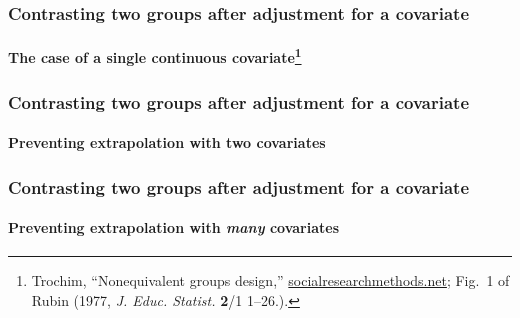 \begin{frame} \frametitle{Contrasting two groups after adjustment for a covariate}
\framesubtitle{The case of a single continuous
  covariate\footnote{Trochim, ``Nonequivalent groups design,''
    \url{socialresearchmethods.net}; Fig.~1 of Rubin (1977, \textit{J. Educ. Statist.} \textbf{2}/1 1--26.).}}

\begin{center}
{}
\end{center}

\end{frame}

\begin{frame}[label=contrast2grFr]
  \frametitle{Contrasting two groups after adjustment for a covariate}
\framesubtitle{Preventing extrapolation with two covariates}

\begin{center}
\end{center}

\end{frame}


\begin{frame}
  \frametitle{Contrasting two groups after adjustment for a covariate}
\framesubtitle{Preventing extrapolation with \textit{many}
  covariates\citep[\textit{cf.} ][\textit{Ann. Intern. Med.}]{rubin:1997}}

  \begin{center}
  \end{center}

\end{frame}

